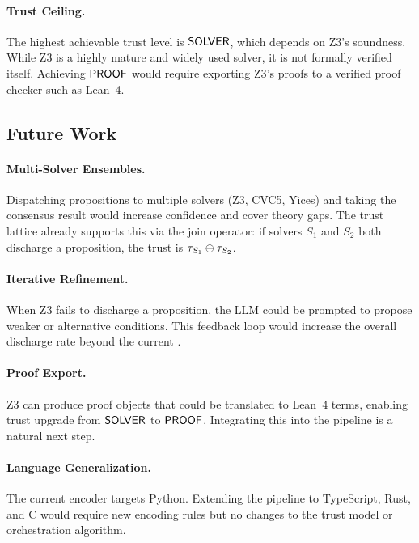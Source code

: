 \documentclass[11pt]{article}
\begin{document}
\paragraph{Trust Ceiling.}
The highest achievable trust level is $\mathsf{SOLVER}$, which depends on
Z3's soundness.  While Z3 is a highly mature and widely used solver,
it is not formally verified itself.  Achieving $\mathsf{PROOF}$ would require
exporting Z3's proofs to a verified proof checker such as Lean~4.

\subsection{Future Work}

\paragraph{Multi-Solver Ensembles.}\label{sec:multi-solver}
Dispatching propositions to multiple solvers (Z3, CVC5, Yices) and
taking the consensus result would increase confidence and cover theory
gaps.  The trust lattice already supports this via the join operator:
if solvers $S_1$ and $S_2$ both discharge a proposition, the trust is
$\tau_{S_1} \oplus \tau_{S_2}$.

\paragraph{Iterative Refinement.}
When Z3 fails to discharge a proposition, the LLM could be prompted to
propose weaker or alternative conditions.  This feedback loop would
increase the overall discharge rate beyond the current
\ppLIdischargeRate.

\paragraph{Proof Export.}
Z3 can produce proof objects that could be translated to Lean~4 terms,
enabling trust upgrade from $\mathsf{SOLVER}$ to $\mathsf{PROOF}$.  Integrating this
into the pipeline is a natural next step.

\paragraph{Language Generalization.}
The current encoder targets Python.  Extending the pipeline to
TypeScript, Rust, and C would require new encoding rules but no changes
to the trust model or orchestration algorithm.

\end{document}
